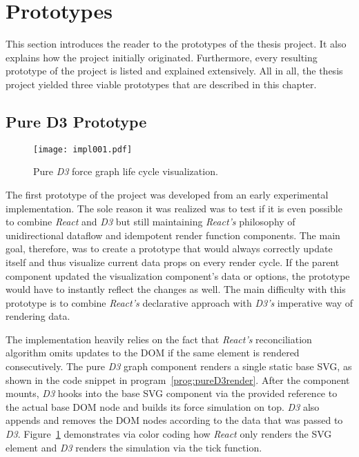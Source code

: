 
\section{Prototypes}

This section introduces the reader to the prototypes of the thesis project. It also explains how the project initially originated. Furthermore, every resulting prototype of the project is listed and explained extensively. All in all, the thesis project yielded three viable prototypes that are described in this chapter. 


\subsection{Pure D3 Prototype}
\label{sec:pureD3prototype}

\begin{figure}
\centering
\texttt{[image: impl001.pdf]}
\caption{Pure \emph{D3} force graph life cycle visualization.}
\label{fig:pureD3Lifecycle}
\end{figure}

The first prototype of the project was developed from an early experimental implementation. The sole reason it was realized was to test if it is even possible to combine \emph{React} and \emph{D3} but still maintaining \emph{React's} philosophy of unidirectional dataflow and idempotent render function components. The main goal, therefore, was to create a prototype that would always correctly update itself and thus visualize current data props on every render cycle. If the parent component updated the visualization component's data or options, the prototype would have to instantly reflect the changes as well. The main difficulty with this prototype is to combine \emph{React's} declarative approach with \emph{D3's} imperative way of rendering data.

The implementation heavily relies on the fact that \emph{React's} reconciliation algorithm omits updates to the DOM if the same element is rendered consecutively. The pure \emph{D3} graph component renders a single static base SVG, as shown in the code snippet in program~\ref{prog:pureD3render}. After the component mounts, \emph{D3} hooks into the base SVG component via the provided reference to the actual base DOM node and builds its force simulation on top. \emph{D3} also appends and removes the DOM nodes according to the data that was passed to \emph{D3}. Figure~\ref{fig:pureD3Lifecycle} demonstrates via color coding how \emph{React} only renders the SVG element and \emph{D3} renders the simulation via the tick function.

